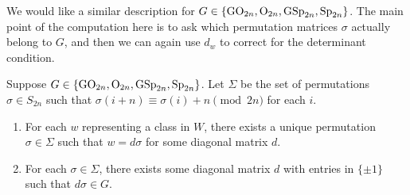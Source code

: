 We would like a similar description for $G\in\{\mathrm{GO}_{2n},\mathrm{O}_{2n},\mathrm{GSp}_{2n},\mathrm{Sp}_{2n}\}$. The main point of the computation here is to ask which permutation matrices $\sigma$ actually belong to $G$, and then we can again use $d_w$ to correct for the determinant condition.
\begin{lemma} \label{lem:weyl-normal-form}
    Suppose $G\in\{\mathrm{GO}_{2n},\mathrm{O}_{2n},\mathrm{GSp}_{2n},\mathrm{Sp}_{2n}\}$. Let $\Sigma$ be the set of permutations $\sigma\in S_{2n}$ such that $\sigma(i+n)\equiv\sigma(i)+n\pmod{2n}$ for each $i$.
    \begin{enumerate}[label=(\alph*)]
        \item For each $w$ representing a class in $W$, there exists a unique permutation $\sigma\in\Sigma$ such that $w=d\sigma$ for some diagonal matrix $d$.
        \item For each $\sigma\in\Sigma$, there exists some diagonal matrix $d$ with entries in $\{\pm1\}$ such that $d\sigma\in G$. %
    \end{enumerate}
\end{lemma}

